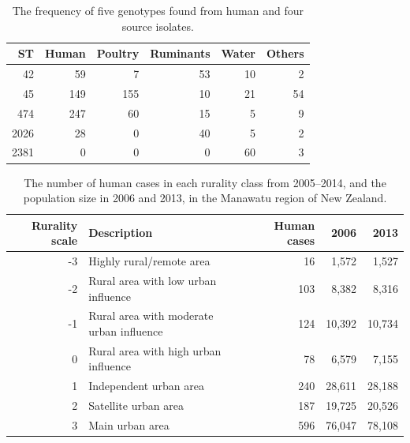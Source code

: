 \documentclass[AMA,STIX1COL]{WileyNJD-v2}
\begin{document}
\begin{table}
  \begin{center}
	\begin{tabular}{rrrrrr}
	\toprule
	ST & Human & Poultry & Ruminants & Water & Others\\
	\midrule
	42 & 59 & 7 & 53 & 10 & 2\\
	45 & 149 & 155 & 10 & 21 & 54\\
	474 & 247 & 60 & 15 & 5 & 9\\
	2026 & 28 & 0 & 40 & 5 & 2\\
	2381 & 0 & 0 & 0 & 60 & 3\\
	\bottomrule
	\end{tabular}
  \end{center}
  \caption{The frequency of five genotypes found from human and four source isolates.}
  \label{tab:counts}
\end{table}

\begin{table}
  \centering
	\begin{tabular}{rlrrr}
	\toprule
	Rurality scale & Description & Human cases & 2006 & 2013\\
	\midrule
	-3 & Highly rural/remote area & 16 & 1,572 & 1,527\\
	-2 & Rural area with low urban influence & 103 & 8,382 & 8,316\\
	-1 & Rural area with moderate urban influence & 124 & 10,392 & 10,734\\
	0 & Rural area with high urban influence & 78 & 6,579 & 7,155\\
	1 & Independent urban area & 240 & 28,611 & 28,188\\
	2 & Satellite urban area & 187 & 19,725 & 20,526\\
	3 & Main urban area & 596 & 76,047 & 78,108\\
	\bottomrule
	\end{tabular}
      \caption{The number of human cases in each rurality class from 2005--2014, and the population size in 2006 and 2013, in the Manawatu region of New Zealand.}
      \label{tab:rurality}
\end{table}
\end{document}
